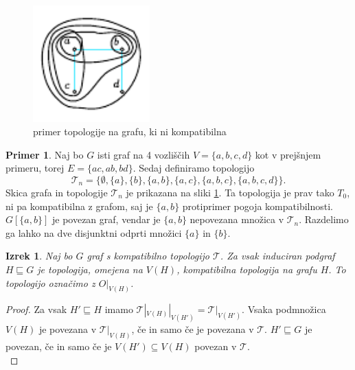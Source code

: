 \documentclass[a4paper, 12pt]{book}
\newtheorem{theorem}{Izrek}[section]
\theoremstyle{definition}
\newtheorem{example}{Primer}[section]
\theoremstyle{remark}
\begin{document}
\begin{figure}[h]
  \begin{center}
  \includegraphics[width=0.4\textwidth]{incompatible-topology.pdf}
  \end{center}
  \caption{primer topologije na grafu, ki ni kompatibilna}
  \label{incompat-topol}
\end{figure}

\begin{example}
  Naj bo $G$ isti graf na 4 vozliščih $V=\{a,b,c,d\}$ kot v prejšnjem primeru, torej $E=\{ac,ab,bd\}$.
  Sedaj definiramo topologijo \[\mathcal{T}_n = \{\emptyset, \{a\}, \{b\}, \{a, b\}, \{a, c\}, \{a, b, c\}, \{a, b, c, d\}\}.\]
  Skica grafa in topologije $\mathcal{T}_n$ je prikazana na sliki \ref{incompat-topol}. Ta topologija je prav tako $T_0$,
  ni pa kompatibilna z grafom, saj je $\{a,b\}$ protiprimer pogoja kompatibilnosti. $G[\{a,b\}]$
  je povezan graf, vendar je $\{a,b\}$ nepovezana množica v $\mathcal{T}_n$. Razdelimo ga lahko na dve
  disjunktni odprti množici $\{a\}$ in $\{b\}$.
\end{example}
\begin{theorem}\label{theorem1}
  Naj bo $G$ graf s kompatibilno topologijo $\mathcal{T}$. Za vsak induciran podgraf
  $H \sqsubseteq G$ je topologija, omejena na $V(H)$, kompatibilna topologija
  na grafu $H$. To topologijo označimo z $O|_{V(H)}$.
\end{theorem}
\begin{proof}
  Za vsak $H' \sqsubseteq H$ imamo $\mathcal{T}|_{V(H)}|_{V(H')} = \mathcal{T}|_{V(H')}$. 
  Vsaka podmnožica $V(H)$ je povezana v $\mathcal{T}|_{V(H)}$, če in samo če je povezana v $\mathcal{T}$.
  $H' \sqsubseteq G$ je povezan, če in samo če je $V(H') \subseteq V(H)$ povezan v $\mathcal{T}$.\\
\end{proof}
\end{document}
